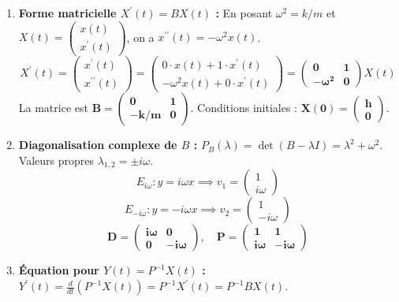 \documentclass[french]{yLectureNote}
\begin{document}
\begin{enumerate}
    \item \textbf{Forme matricielle $X^{\prime}(t)=BX(t)$ :}
    En posant $\omega^2 = k/m$ et $X(t) = \begin{pmatrix}x(t)\\ x^{\prime}(t)\end{pmatrix}$, on a $x^{\prime\prime}(t) = -\omega^2 x(t)$.
    $$X^{\prime}(t) = \begin{pmatrix} x^{\prime}(t) \\ x^{\prime\prime}(t) \end{pmatrix} = \begin{pmatrix} 0 \cdot x(t) + 1 \cdot x^{\prime}(t) \\ -\omega^2 x(t) + 0 \cdot x^{\prime}(t) \end{pmatrix} = \mathbf{\begin{pmatrix} 0&1\\ -\omega^2&0 \end{pmatrix}} X(t)$$
    La matrice est $\mathbf{B = \begin{pmatrix} 0&1\\ -k/m&0 \end{pmatrix}}$. Conditions initiales : $\mathbf{X(0) = \begin{pmatrix} h\\ 0 \end{pmatrix}}$.

    \item \textbf{Diagonalisation complexe de $B$ :}
    $P_B(\lambda) = \det(B - \lambda I) = \lambda^2 + \omega^2$. Valeurs propres $\lambda_{1,2} = \pm i\omega$.
    $$E_{i\omega}: y = i\omega x \implies v_1 = \begin{pmatrix} 1 \\ i\omega \end{pmatrix}$$
    $$E_{-i\omega}: y = -i\omega x \implies v_2 = \begin{pmatrix} 1 \\ -i\omega \end{pmatrix}$$
    $$\mathbf{D = \begin{pmatrix} i\omega&0\\ 0&-i\omega \end{pmatrix}, \quad P = \begin{pmatrix} 1&1\\ i\omega&-i\omega \end{pmatrix}}$$

    \item \textbf{Équation pour $Y(t)=P^{-1}X(t)$ :}
    $Y^{\prime}(t) = \frac{d}{dt}(P^{-1}X(t)) = P^{-1} X^{\prime}(t) = P^{-1} B X(t)$.


\end{enumerate}
\end{document}
